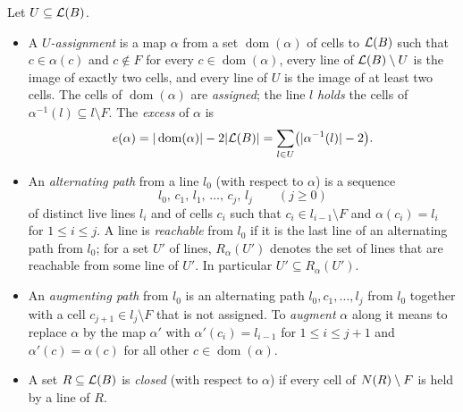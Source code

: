 \begin{definition}\label{def:U-assignment}
Let $U\subseteq\mathcal{L}(B)$.
\begin{itemize}
\item A \emph{$U$-assignment} is a map $\alpha$ from a set $\operatorname{dom}(\alpha)$ of cells to
      $\mathcal{L}(B)$ such that $c\in\alpha(c)$ and $c\notin F$ for every $c\in\operatorname{dom}(\alpha)$, every
      line of $\mathcal{L}(B)\setminus U$ is the image of exactly two cells, and every line of $U$ is the image
      of at least two cells. The cells of $\operatorname{dom}(\alpha)$ are \emph{assigned}; the line $l$
      \emph{holds} the cells of $\alpha^{-1}(l)\subseteq l\setminus F$. The \emph{excess} of $\alpha$ is
      \[
        e(\alpha)=|\operatorname{dom}(\alpha)|-2|\mathcal{L}(B)|=\sum_{l\in U}\bigl(|\alpha^{-1}(l)|-2\bigr).
      \]
\item An \emph{alternating path} from a line $l_0$ (with respect to $\alpha$) is a sequence
      \[ l_0,\,c_1,\,l_1,\,\dots,\,c_j,\,l_j\qquad(j\ge 0) \]
      of distinct live lines $l_i$ and of cells $c_i$ such that
      $c_i\in l_{i-1}\setminus F$ and $\alpha(c_i)=l_i$ for $1\le i\le j$. A line is \emph{reachable} from
      $l_0$ if it is the last line of an alternating path from $l_0$; for a set $U'$ of lines,
      $R_\alpha(U')$ denotes the set of lines that are reachable from some line of $U'$. In particular
      $U'\subseteq R_\alpha(U')$.
\item An \emph{augmenting path} from $l_0$ is an alternating path $l_0,c_1,\dots,l_j$ from $l_0$ together
      with a cell $c_{j+1}\in l_j\setminus F$ that is not assigned. To \emph{augment} $\alpha$ along it
      means to replace $\alpha$ by the map $\alpha'$ with $\alpha'(c_i)=l_{i-1}$ for $1\le i\le j+1$ and
      $\alpha'(c)=\alpha(c)$ for all other $c\in\operatorname{dom}(\alpha)$.
\item A set $R\subseteq\mathcal{L}(B)$ is \emph{closed} (with respect to $\alpha$) if every cell of
      $N(R)\setminus F$ is held by a line of $R$.
\end{itemize}
\end{definition}

